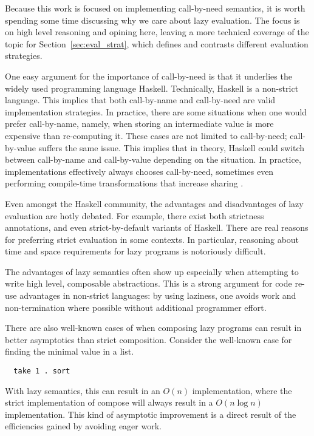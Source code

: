 Because this work is focused on implementing call-by-need semantics, it is worth
spending some time discussing why we care about lazy evaluation. The focus is on
high level reasoning and opining here, leaving a more technical coverage of
the topic for Section~\ref{sec:eval_strat}, which defines and contrasts
different evaluation strategies.

One easy argument for the importance of call-by-need is that it underlies the
widely used programming language Haskell. Technically, Haskell is a non-strict
language.  This implies that both call-by-name and call-by-need are valid
implementation strategies. In practice, there are some situations when one would
prefer call-by-name, namely, when storing an intermediate value is more
expensive than re-computing it. These cases are not limited to call-by-need;
call-by-value suffers the same issue.  This implies that in theory, Haskell
could switch between call-by-name and call-by-value depending on the situation.
In practice, implementations effectively always chooses call-by-need, sometimes
even performing compile-time transformations that increase sharing
\cite{jones96floating}.  

Even amongst the Haskell community, the advantages and disadvantages of
lazy evaluation are hotly debated. For example, there exist both strictness
annotations, and even strict-by-default variants of Haskell. There are real
reasons for preferring strict evaluation in some contexts. In particular,
reasoning about time and space requirements for lazy programs is notoriously
difficult.  

The advantages of lazy semantics often show up especially when attempting to
write high level, composable abstractions. This is a strong argument for code
re-use advantages in non-strict languages: by using laziness, one avoids work
and non-termination where possible without additional programmer effort.

There are also well-known cases of when composing lazy programs can result in
better asymptotics than strict composition. Consider the well-known case for
finding the minimal value in a list. 
\begin{verbatim}
  take 1 . sort
\end{verbatim}
With lazy semantics, this can result in an $O(n)$ implementation, where the
strict implementation of compose will always result in a $O(n \log n)$
implementation. This kind of asymptotic improvement is a direct result of the
efficiencies gained by avoiding eager work. 

